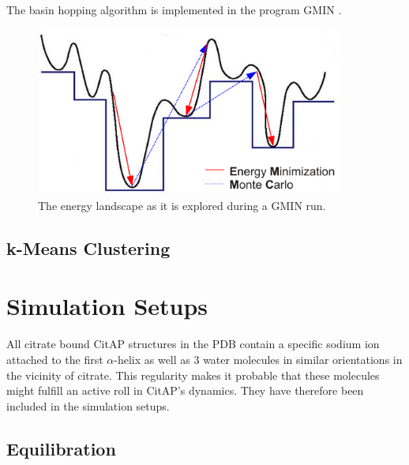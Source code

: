 \documentclass[english, a4paper, 12pt, titlepage, draft]{article}
\begin{document}
The basin hopping algorithm is implemented in the program GMIN \cite{GMIN}.

\begin{figure}
    \centering
    \includegraphics[width=0.9\textwidth]{figures/GMIN.pdf}
    \caption{The energy landscape as it is explored during a GMIN run.}
    \label{fig:GMIN}
\end{figure}        




\subsection{k-Means Clustering}



\section{Simulation Setups}

All citrate bound CitAP structures in the PDB contain a specific sodium ion attached to the first $\alpha$-helix as well as 3 water molecules in similar orientations in the vicinity of citrate.
This regularity makes it probable that these molecules might fulfill an active roll in CitAP's dynamics.
They have therefore been included in the simulation setups.

\subsection{Equilibration}
\end{document}

